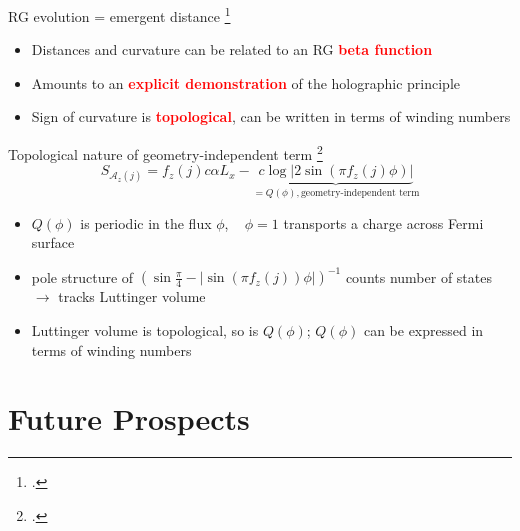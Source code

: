 \documentclass[11pt,aspectratio=169]{beamer}
\newcommand{\focus}[1]{\textcolor{red}{\bf{#1}}}
\begin{document}
\begin{frame}{RG evolution = emergent distance}
	\footcite{maldacena1999large,ryu2006aspects,holzhey_1994}
\begin{itemize}
	\item Distances and curvature can be related to an RG \focus{beta function}\\[10pt]
	\item Amounts to an \focus{explicit demonstration} of the holographic principle\\[10pt]
	\item Sign of curvature is \focus{topological}, can be written in terms of winding numbers\\[10pt]
\end{itemize}
	
\end{frame}

\begin{frame}{Topological nature of geometry-independent term}
	\footcite{luttinger1960ground,luttinger1960fermi,oshikawa2000topological,seki2017topological,anirbanurg1,Heath_2020}
	\[S_{\mathcal{A}_z(j)} = f_z(j) c \alpha L_x - \underbrace{c \log \big|2\sin\left(\pi f_z(j)\phi\right)\big|}_{=Q(\phi),\text{geometry-independent term}}\]
	\begin{itemize}
	\item \(Q(\phi)\) is periodic in the flux \(\phi\), ~ \(\phi=1\) transports a charge across Fermi surface\\[10pt]
	\item pole structure of \(\left(\sin \frac{\pi}{4} - |\sin\left(\pi f_z(j)\right)\phi|\right)^{-1}\) counts number of states \(\longrightarrow\) tracks Luttinger volume\\[10pt]
	\item Luttinger volume is topological, so is \(Q(\phi)\); \(Q(\phi)\) can be expressed in terms of winding numbers
	\end{itemize}
	
\end{frame}

\section{Future Prospects}
\end{document}
